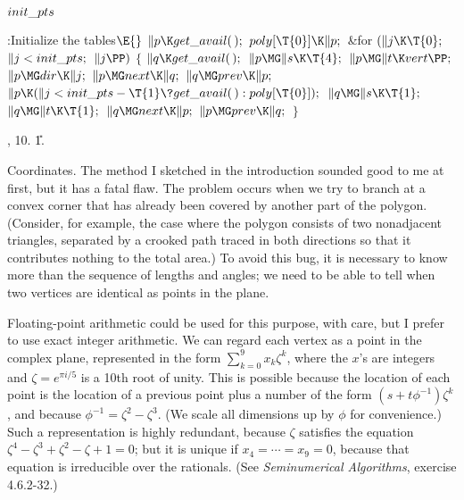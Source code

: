 \Y\B\4\D$\\{init\_pts}$ \5
\par
\Y\B\4:Initialize the tables\X${}\E{}$\6
$\|p\K\\{get\_avail}(\,);{}$\6
${}\\{poly}[\T{0}]\K\|p;{}$\6
\&{for} ${}(\|j\K\T{0};{}$ ${}\|j<\\{init\_pts};{}$ ${}\|j\PP){}$\5
${}\{{}$\1\6
${}\|q\K\\{get\_avail}(\,);{}$\6
${}\|p\MG\|s\K\T{4};{}$\6
${}\|p\MG\|t\K\\{vert}\PP;{}$\6
${}\|p\MG\\{dir}\K\|j;{}$\6
${}\|p\MG\\{next}\K\|q;{}$\6
${}\|q\MG\\{prev}\K\|p;{}$\6
${}\|p\K(\|j<\\{init\_pts}-\T{1}\?\\{get\_avail}(\,):\\{poly}[\T{0}]);{}$\6
${}\|q\MG\|s\K\T{1};{}$\6
${}\|q\MG\|t\K\T{1};{}$\6
${}\|q\MG\\{next}\K\|p;{}$\6
${}\|p\MG\\{prev}\K\|q;{}$\6
\4${}\}{}$\2\par
{}, 10.
\U1.\fi

Coordinates. The method I sketched in the introduction sounded good
to me at first, but it has a fatal flaw. The problem occurs when we
try to branch at a convex corner that has already been covered by
another part of the polygon. (Consider, for example, the case where
the polygon consists of two nonadjacent triangles, separated by a
crooked path traced in both directions so that it contributes nothing
to the total area.) To avoid this bug, it is necessary to know more
than the sequence of lengths and angles; we need to be able to tell
when two vertices are identical as points in the plane.

Floating-point arithmetic could be used for this purpose, with care, but
I prefer to use exact integer arithmetic. We can regard each vertex
as a point in the complex plane, represented in the form $\sum_{k=0}^9
x_k\zeta^k$, where the $x$'s are integers and $\zeta=e^{\pi i/5}$ is a
10th root of unity. This is possible because the location of each point
is the location of a previous point plus a number of the form $(s
+t\phi^{-1})\zeta^k$, and because $\phi^{-1}=\zeta^2-\zeta^3$. (We scale
all dimensions up by $\phi$ for convenience.) Such a representation is
highly redundant, because $\zeta$ satisfies the equation $\zeta^4-\zeta^3
+\zeta^2-\zeta+1=0$; but it is unique if $x_4=\cdots=x_9=0$, because that
equation is irreducible over the rationals. (See {\sl Seminumerical
Algorithms}, exercise 4.6.2-32.)

